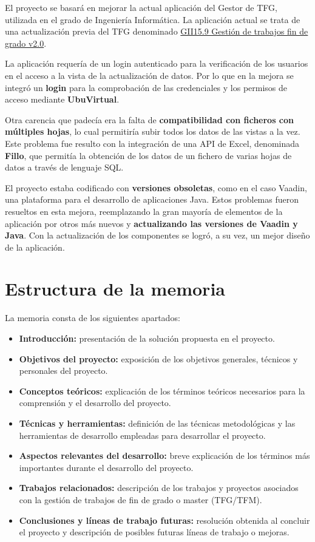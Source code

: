 El proyecto se basará en mejorar la actual aplicación del Gestor de TFG, utilizada en el grado de Ingeniería Informática. La aplicación actual se trata de una actualización previa del TFG denominado \href{https://github.com/jfb0019/Gestor-TFG-2016}{GII15.9 Gestión de trabajos fin de grado v2.0}. 

La aplicación requería de un login autenticado para la verificación de los usuarios en el acceso a la vista de la actualización de datos. Por lo que en la mejora se integró un \textbf{login} para la comprobación de las credenciales y los permisos de acceso mediante \textbf{UbuVirtual}.

Otra carencia que padecía era la falta de \textbf{compatibilidad con ficheros con múltiples hojas}, lo cual permitiría subir todos los datos de las vistas a la vez. Este problema fue resulto con la integración de una API de Excel, denominada \textbf{Fillo}, que permitía la obtención de los datos de un fichero de varias hojas de datos a través de lenguaje SQL.

El proyecto estaba codificado con \textbf{versiones obsoletas}, como en el caso Vaadin, una plataforma para el desarrollo de aplicaciones Java. Estos problemas fueron resueltos en esta mejora, reemplazando la gran mayoría de elementos de la aplicación por otros más nuevos y \textbf{actualizando las versiones de Vaadin y Java}. Con la actualización de los componentes se logró, a su vez, un mejor diseño de la aplicación.

\section{Estructura de la memoria}
La memoria consta de los siguientes apartados:

\begin{itemize}
	\item \textbf{Introducción:} presentación de la solución propuesta en el proyecto. 
	\item \textbf{Objetivos del proyecto:}  exposición de los  objetivos generales, técnicos y personales del proyecto.
	\item \textbf{Conceptos teóricos:} explicación de los términos teóricos necesarios para la comprensión y el desarrollo del proyecto.
	\item \textbf{Técnicas y herramientas:} definición de las técnicas metodológicas y las herramientas de desarrollo empleadas para desarrollar el proyecto.
	\item \textbf{Aspectos relevantes del desarrollo:} breve explicación de los términos más importantes durante el desarrollo del proyecto.
	\item \textbf{Trabajos relacionados:} descripción de los trabajos y proyectos asociados con la gestión de trabajos de fin de grado o master (TFG/TFM).
	\item \textbf{Conclusiones y líneas de trabajo futuras:} resolución obtenida al concluir el proyecto y descripción de posibles futuras líneas de trabajo o mejoras.
\end{itemize}